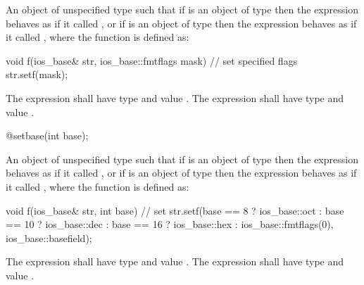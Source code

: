 \begin{itemdescr}
\pnum
\returns
An object of unspecified type such that if
is an object of type
then the expression
behaves as if it called
,
or if
is an object of type
then the expression
behaves as if it called
, where the function  is defined as:
%

\begin{codeblock}
void f(ios_base& str, ios_base::fmtflags mask) {
  // set specified flags
  str.setf(mask);
}
\end{codeblock}

The expression
shall have type
and value
.
The expression
shall have type
and value
.
\end{itemdescr}

%
\begin{itemdecl}
@\unspec@ setbase(int base);
\end{itemdecl}

\begin{itemdescr}
\pnum
\returns
An object of unspecified type such that if
is an object of type
then the expression
behaves as if it called
,
or if
is an object of type
then the expression
behaves as if it called
, where the function  is defined as:

\begin{codeblock}
void f(ios_base& str, int base) {
  // set 
  str.setf(base ==  8 ? ios_base::oct :
      base == 10 ? ios_base::dec :
      base == 16 ? ios_base::hex :
      ios_base::fmtflags(0), ios_base::basefield);
}
\end{codeblock}

The expression
shall have type
and value
.
The expression
shall have type
and value
.
\end{itemdescr}

